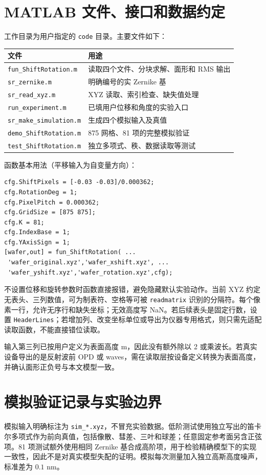 \documentclass[UTF8,a4paper,zihao=-4]{ctexart}
\begin{document}
\section{MATLAB 文件、接口和数据约定}
工作目录为用户指定的 \texttt{code} 目录。主要文件如下：
\begin{center}\small
\begin{tabular}{ll}\toprule
文件&用途\\\midrule
\texttt{fun\_ShiftRotation.m}&读取四个文件、分块求解、面形和 RMS 输出\\
\texttt{sr\_zernike.m}&明确编号的实 Zernike 基\\
\texttt{sr\_read\_xyz.m}&XYZ 读取、索引检查、缺失值处理\\
\texttt{run\_experiment.m}&已填用户位移和角度的实验入口\\
\texttt{sr\_make\_simulation.m}&生成四个模拟输入及真值\\
\texttt{demo\_ShiftRotation.m}&875 网格、81 项的完整模拟验证\\
\texttt{test\_ShiftRotation.m}&独立多项式、秩、数据读取等测试\\\bottomrule
\end{tabular}\end{center}
函数基本用法（平移输入为自变量方向）：
\begin{verbatim}
cfg.ShiftPixels = [-0.03 -0.03]/0.000362;
cfg.RotationDeg = 1;
cfg.PixelPitch = 0.000362;
cfg.GridSize = [875 875];
cfg.K = 81;
cfg.IndexBase = 1;
cfg.YAxisSign = 1;
[wafer,out] = fun_ShiftRotation( ...
 'wafer_original.xyz','wafer_xshift.xyz', ...
 'wafer_yshift.xyz','wafer_rotation.xyz',cfg);
\end{verbatim}
不设置位移和旋转参数时函数直接报错，避免隐藏默认实验动作。当前 XYZ 约定无表头、三列数值，可为制表符、空格等可被 \texttt{readmatrix} 识别的分隔符。每个像素一行，允许无序行和缺失坐标；无效高度写 NaN。若后续表头是固定行数，设置 \texttt{HeaderLines}；若增加列、改变坐标单位或导出为仪器专用格式，则只需先适配读取函数，不能直接错位读取。

输入第三列已按用户定义为表面高度 m，因此没有额外除以 2 或乘波长。若真实设备导出的是反射波前 OPD 或 waves，需在读取层按设备定义转换为表面高度，并确认面形正负号与本文模型一致。

\section{模拟验证记录与实验边界}
模拟输入明确标注为 \texttt{sim\_*.xyz}，不冒充实验数据。低阶测试使用独立写出的笛卡尔多项式作为前向真值，包括像散、彗差、三叶和球差；任意固定参考面另含正弦项。81 项测试额外使用相同 Zernike 基合成高阶项，用于检验精确模型下的实现一致性，因此不是对真实模型失配的证明。模拟每次测量加入独立高斯高度噪声，标准差为 $0.1$ nm。
\end{document}
